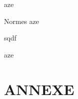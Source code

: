 \documentclass[
	11pt, %
	fleqn, %
	a4paper, %
]{LegrandOrangeBook}
\begin{document}
\begin{corollary}[S2.4] 
aze
\end{corollary}

\begin{definition}{Normes}
aze
\end{definition}

\begin{theorem}
    sqdf
\end{theorem}

\begin{remark}
    aze
\end{remark}







\chapterspaceabove{6.25cm} %
\chapterspacebelow{7.5cm} %



	




\newpage
\section{ANNEXE}


{} %
\printindex %
\end{document}
